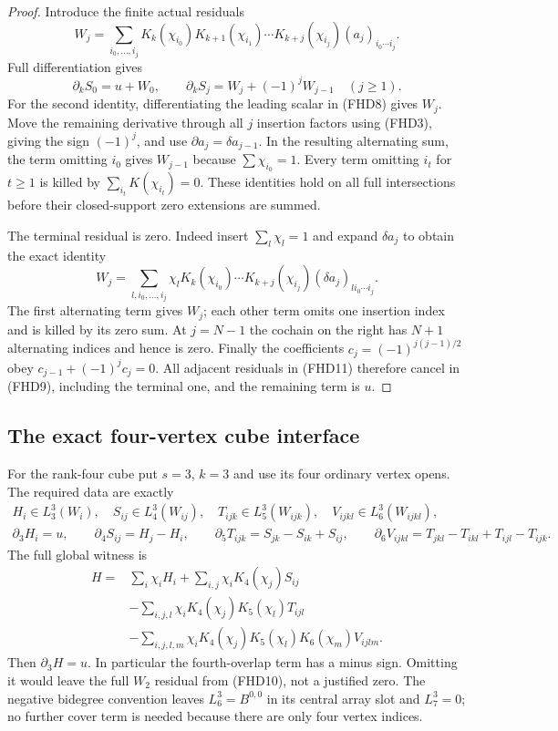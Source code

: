 \begin{proof}
Introduce the finite actual residuals
\[
 W_j=\sum_{i_0,\ldots,i_j}
       K_k(\chi_{i_0})K_{k+1}(\chi_{i_1})\cdots
       K_{k+j}(\chi_{i_j})(a_j)_{i_0\cdots i_j}.
 \tag{FHD10}
\]
Full differentiation gives
\[
 \partial_kS_0=u+W_0,\qquad
 \partial_kS_j=W_j+(-1)^jW_{j-1}\quad(j\ge1).
 \tag{FHD11}
\]
For the second identity, differentiating the leading scalar in
(FHD8) gives $W_j$.  Move the remaining derivative through all
$j$ insertion factors using (FHD3), giving the sign $(-1)^j$,
and use $\partial a_j=\delta a_{j-1}$.  In the resulting
alternating sum, the term omitting $i_0$ gives $W_{j-1}$ because
$\sum\chi_{i_0}=1$.  Every term omitting $i_t$ for $t\ge1$
is killed by $\sum_{i_t}K(\chi_{i_t})=0$.  These identities
hold on all full intersections before their closed-support
zero extensions are summed.

The terminal residual is zero.  Indeed insert $\sum_l\chi_l=1$
and expand $\delta a_j$ to obtain the exact identity
\[
 W_j=\sum_{l,i_0,\ldots,i_j}\chi_l
     K_k(\chi_{i_0})\cdots K_{k+j}(\chi_{i_j})
                           (\delta a_j)_{l i_0\cdots i_j}.
 \tag{FHD12}
\]
The first alternating term gives $W_j$; each other term omits
one insertion index and is killed by its zero sum.  At $j=N-1$
the cochain on the right has $N+1$ alternating indices and hence
is zero.  Finally the coefficients
$c_j=(-1)^{j(j-1)/2}$ obey
$c_{j-1}+(-1)^jc_j=0$.  All adjacent residuals in (FHD11)
therefore cancel in (FHD9), including the terminal one, and the
remaining term is $u$.
\end{proof}

\subsection{The exact four-vertex cube interface}

For the rank-four cube put $s=3$, $k=3$ and use its four ordinary
vertex opens.  The required data are exactly
\[
 \begin{gathered}
 H_i\in L_3^3(W_i),\quad S_{ij}\in L_4^3(W_{ij}),\quad
 T_{ijk}\in L_5^3(W_{ijk}),\quad V_{ijkl}\in L_6^3(W_{ijkl}),\\
 \partial_3H_i=u,\qquad
 \partial_4S_{ij}=H_j-H_i,\qquad
 \partial_5T_{ijk}=S_{jk}-S_{ik}+S_{ij},\qquad
 \partial_6V_{ijkl}=T_{jkl}-T_{ikl}+T_{ijl}-T_{ijk}.
 \end{gathered}
 \tag{FHD13}
\]
The full global witness is
\[
 \begin{split}
 H={}&\sum_i\chi_iH_i
       +\sum_{i,j}\chi_iK_4(\chi_j)S_{ij}\\
     &-\sum_{i,j,l}\chi_iK_4(\chi_j)K_5(\chi_l)T_{ijl}\\
     &-\sum_{i,j,l,m}\chi_iK_4(\chi_j)K_5(\chi_l)
                                      K_6(\chi_m)V_{ijlm}.
 \end{split}
 \tag{FHD14}
\]
Then $\partial_3H=u$.  In particular the fourth-overlap term
has a minus sign.  Omitting it would leave the full $W_2$
residual from (FHD10), not a justified zero.  The negative
bidegree convention leaves $L_6^3=B^{0,0}$ in its central array
slot and $L_7^3=0$; no further cover term is needed because
there are only four vertex indices.

